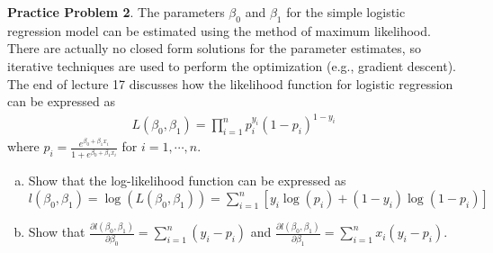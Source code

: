 \documentclass[11pt]{article}\usepackage[]{graphicx}\usepackage[]{color}
\begin{document}
\textbf{Practice Problem 2}. The parameters $\beta_0$ and $\beta_1$ for the simple logistic regression model can be estimated using the method of maximum likelihood.  There are actually no closed form solutions for the parameter estimates, so iterative techniques are used to perform the optimization (e.g., gradient descent).  The end of lecture 17 discusses how the likelihood function for logistic regression can be expressed as  
\begin{align*}
L(\beta_0, \beta_1) = \prod_{i=1}^n p_i^{y_i} (1-p_i)^{1-y_i}
\end{align*}
where $p_i = \frac{e^{\beta_0 + \beta_1 x_i}}{1 + e^{\beta_0 + \beta_1 x_i}}$ for $i=1, \cdots, n$.
\smallskip
\begin{enumerate}[(a)]
\item Show that the log-likelihood function can be expressed as\\ $l(\beta_0, \beta_1) = \log(L(\beta_0, \beta_1))
= \sum_{i=1}^n [ y_i \log(p_i) + (1-y_i) \log(1-p_i)]$
\smallskip
\item Show that $\frac{\partial l(\beta_0, \beta_1)}{\partial \beta_0} = \sum_{i=1}^n (y_i - p_i)$ and $\frac{\partial l(\beta_0, \beta_1)}{\partial \beta_1} = \sum_{i=1}^n x_i (y_i - p_i)$.
\end{enumerate}
\end{document}
